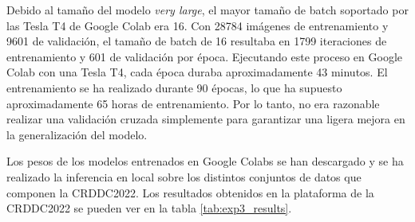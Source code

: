 Debido al tamaño del modelo \textit{very large}, el mayor tamaño de batch soportado por las Tesla T4 de Google Colab era 16. Con 28784 imágenes de entrenamiento y 9601 de validación, el tamaño de batch de 16 resultaba en 1799 iteraciones de entrenamiento y 601 de validación por época. Ejecutando este proceso en Google Colab con una Tesla T4, cada época duraba aproximadamente 43 minutos. El entrenamiento se ha realizado durante 90 épocas, lo que ha supuesto aproximadamente 65 horas de entrenamiento. Por lo tanto, no era razonable realizar una validación cruzada simplemente para garantizar una ligera mejora en la generalización del modelo.

Los pesos de los modelos entrenados en Google Colabs se han descargado y se ha realizado la inferencia en local sobre los distintos conjuntos de datos que componen la CRDDC2022. Los resultados obtenidos en la plataforma de la CRDDC2022 se pueden ver en la tabla \ref{tab:exp3_results}.

\begin{table}[H]
    \centering
    \caption{F1-scores obtenidos en la plataforma de la CRDDC2022 para los distintos conjuntos de datos.}
    \label{tab:exp3_results}
\end{table}

